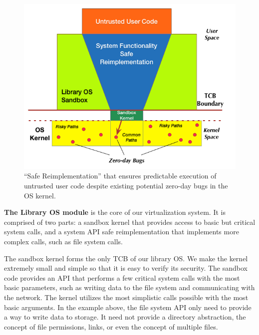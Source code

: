 {\begin{figure}%
\centering
\includegraphics[width=1.0\columnwidth]{diagram/Virtualization_Design_Model_01.png}
\caption{\small ``Safe Reimplementation'' that ensures predictable execution of untrusted user code
despite existing potential zero-day bugs in the OS kernel.}
\label{fig:design_safe_reimplementation}
\end{figure}


%


\textbf{The Library OS module} is the core of our virtualization system. It is comprised
of two parts: a sandbox kernel that provides access to basic but critical
system calls, and a system API safe reimplementation that implements more
complex calls, such as file system calls.

The sandbox kernel forms the only TCB of our library OS.
We make the kernel extremely small and simple so that it is easy to verify its security.
The sandbox code provides an API that performs
a few critical system calls with the most basic parameters, such as
writing data to the file system
and communicating with the network.  The kernel utilizes the most simplistic calls
possible with the most
basic arguments. In the example above, the file system API only need to provide a way
to write data to storage.  It need not provide a directory abstraction, the
concept of file permissions, links, or even the concept of multiple files.

}
